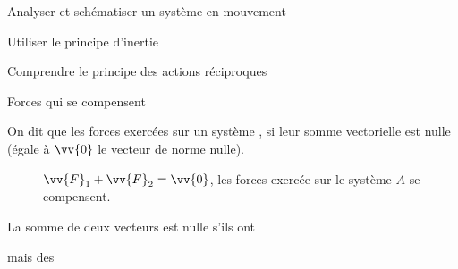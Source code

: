 \teteSndMouv
\nomPrenomClasse
{}


\begin{objectifs}
  \item Analyser et schématiser un système en mouvement
  \item Utiliser le principe d'inertie
  \item Comprendre le principe des actions réciproques
\end{objectifs}

\begin{doc}{Forces qui se compensent}
  \begin{importants}
    On dit que les forces exercées sur un système , si leur somme vectorielle est nulle (égale à $\vv{0}$ le vecteur de norme nulle).
    
    \begin{wrapfigure}{r}{0.4\linewidth}
      \vspace*{-40pt}
      \begin{center}
      
        $\vv{F}_1 + \vv{F}_2 = \vv{0}$, les forces exercée sur le système $A$ se compensent.
      \end{center}
    \end{wrapfigure}
    
    La somme de deux vecteurs est nulle s'ils ont
    
    \begin{listePoints}
      \item {}
      \item {}
      \item {}
      \item mais des 
    \end{listePoints}
  \end{importants}
\end{doc}

